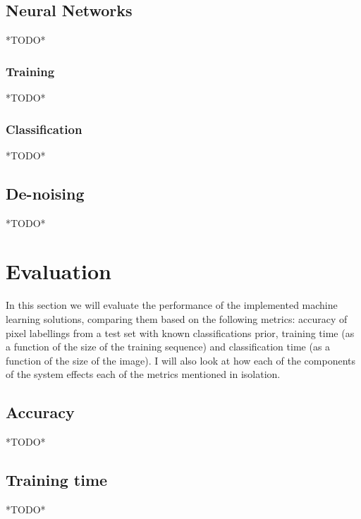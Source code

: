 \documentclass[12pt,twoside,notitlepage]{report}
\begin{document}
    \section{Neural Networks}
    *TODO*

      \subsection{Training}
      *TODO*

      \subsection{Classification}
      *TODO*

    \section{De-noising}
    *TODO*











\cleardoublepage
\chapter{Evaluation}
    In this section we will evaluate the performance of the implemented machine learning solutions, comparing them based 
    on the following metrics: accuracy of pixel labellings from a test set with known classifications prior, training 
    time (as a function of the size of the training sequence) and classification time (as a function of the size of the 
    image). I will also look at how each of the components of the system effects each of the metrics mentioned in 
    isolation.

    \section{Accuracy}
    *TODO*

    \section{Training time}
    *TODO*
\end{document}
